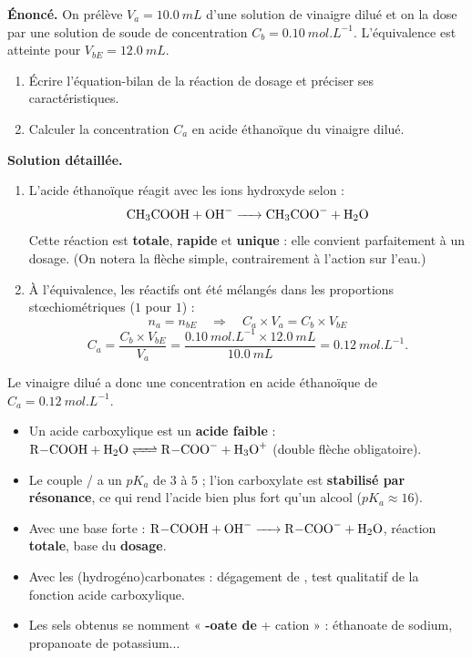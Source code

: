 \documentclass[11pt]{article}
\begin{document}
\begin{exoresolu}
\textbf{Énoncé.} On prélève $V_a = \SI{10,0}{mL}$ d'une solution de vinaigre dilué et on la dose par une solution de soude de concentration $C_b = \SI{0,10}{mol.L^{-1}}$. L'équivalence est atteinte pour $V_{bE} = \SI{12,0}{mL}$.
\begin{enumerate}
\item Écrire l'équation-bilan de la réaction de dosage et préciser ses caractéristiques.
\item Calculer la concentration $C_a$ en acide éthanoïque du vinaigre dilué.
\end{enumerate}
\tcblower
\textbf{Solution détaillée.}
\begin{enumerate}
\item L'acide éthanoïque réagit avec les ions hydroxyde selon :
\[ \ce{CH3COOH + OH- -> CH3COO- + H2O} \]
Cette réaction est \textbf{totale}, \textbf{rapide} et \textbf{unique} : elle convient parfaitement à un dosage. (On notera la flèche simple, contrairement à l'action sur l'eau.)
\item À l'équivalence, les réactifs ont été mélangés dans les proportions stœchiométriques ($1$ pour $1$) :
\[ n_a = n_{bE} \quad \Longrightarrow \quad C_a \times V_a = C_b \times V_{bE} \]
\[ C_a = \frac{C_b \times V_{bE}}{V_a} = \frac{\SI{0,10}{mol.L^{-1}} \times \SI{12,0}{mL}}{\SI{10,0}{mL}} = \SI{0,12}{mol.L^{-1}}. \]
\end{enumerate}
Le vinaigre dilué a donc une concentration en acide éthanoïque de $\boxed{C_a = \SI{0,12}{mol.L^{-1}}}$.
\end{exoresolu}

\begin{aretenir}
\begin{itemize}
\item Un acide carboxylique est un \textbf{acide faible} : $\ce{R-COOH + H2O <=> R-COO- + H3O+}$ (double flèche obligatoire).
\item Le couple / a un $pK_a$ de $3$ à $5$ ; l'ion carboxylate est \textbf{stabilisé par résonance}, ce qui rend l'acide bien plus fort qu'un alcool ($pK_a \approx 16$).
\item Avec une base forte : $\ce{R-COOH + OH- -> R-COO- + H2O}$, réaction \textbf{totale}, base du \textbf{dosage}.
\item Avec les (hydrogéno)carbonates : dégagement de , test qualitatif de la fonction acide carboxylique.
\item Les sels obtenus se nomment « \textbf{-oate de} + cation » : éthanoate de sodium, propanoate de potassium...
\end{itemize}
\end{aretenir}
\end{document}
